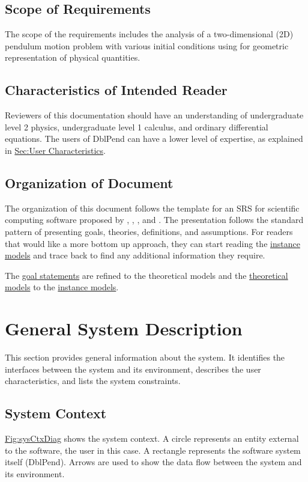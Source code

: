 \documentclass[12pt]{article}
\begin{document}
{\subsection{Scope of Requirements}
\label{Sec:ReqsScope}
The scope of the requirements includes the analysis of a two-dimensional (2D) pendulum motion problem with various initial conditions using for geometric representation of physical quantities.

\subsection{Characteristics of Intended Reader}
\label{Sec:ReaderChars}
Reviewers of this documentation should have an understanding of undergraduate level 2 physics, undergraduate level 1 calculus, and ordinary differential equations. The users of DblPend can have a lower level of expertise, as explained in \hyperref[Sec:UserChars]{Sec:User Characteristics}.

\subsection{Organization of Document}
\label{Sec:DocOrg}
The organization of this document follows the template for an SRS for scientific computing software proposed by \cite{koothoor2013}, \cite{smithLai2005}, \cite{smithEtAl2007}, and \cite{smithKoothoor2016}. The presentation follows the standard pattern of presenting goals, theories, definitions, and assumptions. For readers that would like a more bottom up approach, they can start reading the \hyperref[Sec:IMs]{instance models} and trace back to find any additional information they require.

The \hyperref[Sec:GoalStmt]{goal statements} are refined to the theoretical models and the \hyperref[Sec:TMs]{theoretical models} to the \hyperref[Sec:IMs]{instance models}.

\section{General System Description}
\label{Sec:GenSysDesc}
This section provides general information about the system. It identifies the interfaces between the system and its environment, describes the user characteristics, and lists the system constraints.

\subsection{System Context}
\label{Sec:SysContext}
\hyperref[Figure:sysCtxDiag]{Fig:sysCtxDiag} shows the system context. A circle represents an entity external to the software, the user in this case. A rectangle represents the software system itself (DblPend). Arrows are used to show the data flow between the system and its environment.

}
\end{document}
